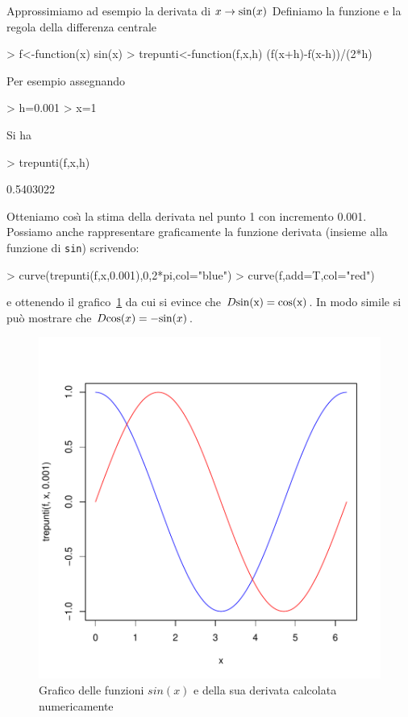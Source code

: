 \documentclass[onecolumn,11pt]{book}
\begin{document}
Approssimiamo ad esempio la derivata di $x\rightarrow {\rm sin}(x)$
Definiamo la funzione e la regola della differenza centrale
\begin{Schunk}
\begin{Sinput}
> f<-function(x) sin(x)
> trepunti<-function(f,x,h) (f(x+h)-f(x-h))/(2*h)
\end{Sinput}
\end{Schunk}
Per esempio assegnando  
\begin{Schunk}
\begin{Sinput}
> h=0.001
> x=1
\end{Sinput}
\end{Schunk}
Si ha 
\begin{Schunk}
\begin{Sinput}
> trepunti(f,x,h)
\end{Sinput}
\begin{Soutput}
[1] 0.5403022
\end{Soutput}
\end{Schunk}
Otteniamo cos\`\i\; la stima della derivata nel punto 1 con incremento 0.001.
Possiamo anche rappresentare graficamente la funzione derivata (insieme alla funzione di \texttt{sin}) scrivendo:
\begin{Schunk}
\begin{Sinput}
> curve(trepunti(f,x,0.001),0,2*pi,col="blue")
> curve(f,add=T,col="red")
\end{Sinput}
\end{Schunk}
e ottenendo il grafico~\ref{sincos} da cui si evince che  $D\rm{sin}(x)={\rm cos}(x)$. In modo simile si pu\`o mostrare che 
$D{\rm cos}(x)=-{\rm sin}(x)$.
\begin{figure}[ htbp]
\begin{center}
\includegraphics{Rmatematica-116}
\caption{Grafico delle funzioni $sin(x)$ e della sua derivata calcolata numericamente}
\label{sincos}
\end{center}
\end{figure}
\end{document}
